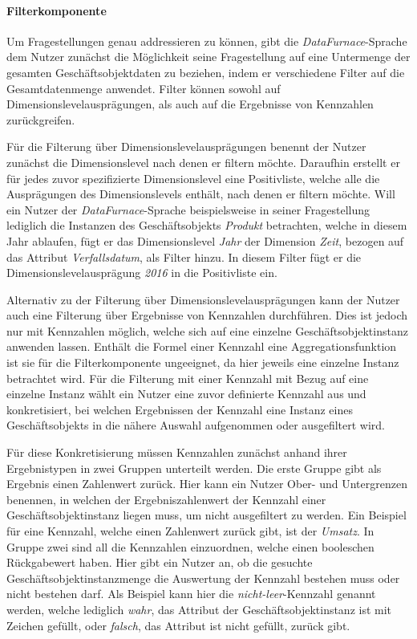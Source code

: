 \documentclass[
  language=german, %
  type=bachelor,%
  ngerman
]{isthesis}
\begin{document}
\begin{content}
  \paragraph{Filterkomponente}\label{paragraph:filternde-komponente} Um
  Fragestellungen genau addressieren zu können, gibt die
  \textit{DataFurnace}-Sprache dem Nutzer zunächst die Möglichkeit seine
  Fragestellung auf eine Untermenge der gesamten Geschäftsobjektdaten zu
  beziehen, indem er verschiedene Filter auf die Gesamtdatenmenge anwendet.
  Filter können sowohl auf Dimensionslevelausprägungen, als auch auf die
  Ergebnisse von Kennzahlen zurückgreifen. 
  
  Für die Filterung über Dimensionslevelausprägungen benennt der Nutzer
  zunächst die Dimensionslevel nach denen er filtern möchte. Daraufhin erstellt
  er für jedes zuvor spezifizierte Dimensionslevel eine Positivliste, welche
  alle die Ausprägungen des Dimensionslevels enthält, nach denen er filtern
  möchte. Will ein Nutzer der \textit{DataFurnace}-Sprache beispielsweise in
  seiner Fragestellung lediglich die Instanzen des Geschäftsobjekts
  \textit{Produkt} betrachten, welche in diesem Jahr ablaufen, fügt er das
  Dimensionslevel \textit{Jahr} der Dimension \textit{Zeit}, bezogen auf das
  Attribut \textit{Verfallsdatum}, als Filter hinzu. In diesem Filter fügt er
  die Dimensionslevelausprägung \textit{2016} in die Positivliste ein.

	Alternativ zu der Filterung über Dimensionslevelausprägungen kann der Nutzer
	auch eine Filterung über Ergebnisse von Kennzahlen durchführen. Dies ist
	jedoch nur mit Kennzahlen möglich, welche sich auf eine einzelne
	Geschäftsobjektinstanz anwenden lassen. Enthält die Formel einer Kennzahl
	eine Aggregationsfunktion ist sie für die Filterkomponente ungeeignet, da
	hier jeweils eine einzelne Instanz betrachtet wird. Für die Filterung mit
	einer Kennzahl mit Bezug auf eine einzelne Instanz wählt ein Nutzer eine
	zuvor definierte Kennzahl aus und konkretisiert, bei welchen Ergebnissen der
	Kennzahl eine Instanz eines Geschäftsobjekts in die nähere Auswahl
	aufgenommen oder ausgefiltert wird.

  Für diese Konkretisierung müssen Kennzahlen zunächst anhand ihrer
  Ergebnistypen in zwei Gruppen unterteilt werden. Die erste Gruppe gibt als
  Ergebnis einen Zahlenwert zurück. Hier kann ein Nutzer Ober- und Untergrenzen
  benennen, in welchen der Ergebniszahlenwert der Kennzahl einer
  Geschäftsobjektinstanz liegen muss, um nicht ausgefiltert zu werden. Ein
  Beispiel für eine Kennzahl, welche einen Zahlenwert zurück gibt, ist der
  \textit{Umsatz}. In Gruppe zwei sind all die Kennzahlen einzuordnen, welche
  einen booleschen Rückgabewert haben. Hier gibt ein Nutzer an, ob die gesuchte
  Geschäftsobjektinstanzmenge die Auswertung der Kennzahl bestehen muss oder
  nicht bestehen darf. Als Beispiel kann hier die \textit{nicht-leer}-Kennzahl
  genannt werden, welche lediglich \textit{wahr}, das Attribut der
  Geschäftsobjektinstanz ist mit Zeichen gefüllt, oder \textit{falsch}, das
  Attribut ist nicht gefüllt, zurück gibt.


\end{content}
\end{document}
